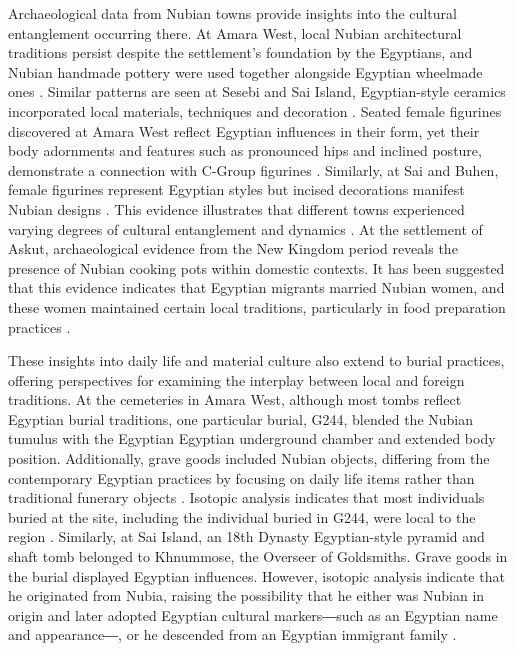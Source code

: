 Archaeological data from Nubian towns provide insights into the cultural entanglement occurring there. At Amara West, local Nubian architectural traditions persist despite the settlement’s foundation by the Egyptians, and Nubian handmade pottery were used together alongside Egyptian wheelmade ones \parencite{spencerNubianArchitectureEgyptian2010, spencerMaintainingRamessideEmpire2024}. Similar patterns are seen at Sesebi and Sai Island, Egyptian-style ceramics incorporated local materials, techniques and decoration \parencites[p.~471]{roseSesebiCeramicsChronology2017}[p.~225]{budkaMaterialRemainsNew2020}. Seated female figurines discovered at Amara West reflect Egyptian influences in their form, yet their body adornments and features such as pronounced hips and inclined posture, demonstrate a connection with C-Group figurines \parencite{stevensFemaleFigurinesFolk2017}. Similarly, at Sai and Buhen, female figurines represent Egyptian styles but incised decorations manifest Nubian designs \parencite[p.~183]{budkaLifeNewKingdom2012}. This evidence illustrates that different towns experienced varying degrees of cultural entanglement and dynamics \parencite[p.~44]{spencerIntroductionHistoryHistoriography2017}. At the settlement of Askut, archaeological evidence from the New Kingdom period reveals the presence of Nubian cooking pots within domestic contexts. It has been suggested that this evidence indicates that Egyptian migrants married Nubian women, and these women maintained certain local traditions, particularly in food preparation practices \parencites{smithWretchedKushEthnic2003, smithEthnicityCulture2007}[p.~540]{vanpeltRevisingEgyptoNubianRelations2013}.

These insights into daily life and material culture also extend to burial practices, offering perspectives for examining the interplay between local and foreign traditions. At the cemeteries in Amara West, although most tombs reflect Egyptian burial traditions, one particular burial, G244, blended the Nubian tumulus with the Egyptian Egyptian underground chamber and extended body position. Additionally, grave goods included Nubian objects, differing from the contemporary Egyptian practices by focusing on daily life items rather than traditional funerary objects \parencite[p.~594-607]{binderNewKingdomTombs2017}. Isotopic analysis indicates that most individuals buried at the site, including the individual buried in G244, were local to the region \parencite[p.~44-45]{spencerMaintainingRamessideEmpire2024}. Similarly, at Sai Island, an 18th Dynasty Egyptian-style pyramid and shaft tomb belonged to Khnummose, the Overseer of Goldsmiths. Grave goods in the burial displayed Egyptian influences. However, isotopic analysis indicate that he originated from Nubia, raising the possibility that he either was Nubian in origin and later adopted Egyptian cultural markers―such as an Egyptian name and appearance―, or he descended from an Egyptian immigrant family \parencite{retzmannNewKingdomPopulation2019}.

